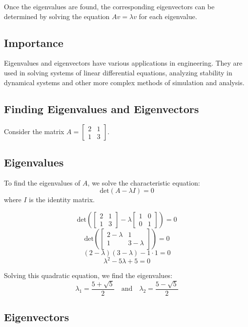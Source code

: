 \documentclass[a4paper,12pt]{article}
\begin{document}
Once the eigenvalues are found, the corresponding eigenvectors can be determined by solving the equation \(Av = \lambda v\) for each eigenvalue.

\subsection*{Importance}

Eigenvalues and eigenvectors have various applications in engineering. They are used in solving systems of linear differential equations, analyzing stability in dynamical systems and other more complex methods of simulation and analysis.


\subsection*{Finding Eigenvalues and Eigenvectors}

Consider the matrix \(A = \begin{bmatrix} 2 & 1 \\ 1 & 3 \end{bmatrix}\).

\subsection*{Eigenvalues}

To find the eigenvalues of \(A\), we solve the characteristic equation:
\[
\text{det}(A - \lambda I) = 0
\]
where \(I\) is the identity matrix.

\[
\text{det}\left(\begin{bmatrix} 2 & 1 \\ 1 & 3 \end{bmatrix} - \lambda \begin{bmatrix} 1 & 0 \\ 0 & 1 \end{bmatrix}\right) = 0
\]
\[
\text{det}\left(\begin{bmatrix} 2 - \lambda & 1 \\ 1 & 3 - \lambda \end{bmatrix}\right) = 0
\]
\[
(2 - \lambda)(3 - \lambda) - 1 \cdot 1 = 0
\]
\[
\lambda^2 - 5\lambda + 5 = 0
\]

Solving this quadratic equation, we find the eigenvalues:
\[
\lambda_1 = \frac{5 + \sqrt{5}}{2} \quad \text{and} \quad \lambda_2 = \frac{5 - \sqrt{5}}{2}
\]

\subsection*{Eigenvectors}
\end{document}
